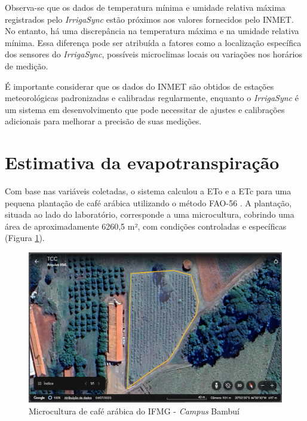 Observa-se que os dados de temperatura mínima e umidade relativa máxima registrados pelo \textit{IrrigaSync} estão próximos aos valores fornecidos pelo INMET. No entanto, há uma discrepância na temperatura máxima e na umidade relativa mínima. Essa diferença pode ser atribuída a fatores como a localização específica dos sensores do \textit{IrrigaSync}, possíveis microclimas locais ou variações nos horários de medição.

É importante considerar que os dados do INMET são obtidos de estações meteorológicas padronizadas e calibradas regularmente, enquanto o \textit{IrrigaSync} é um sistema em desenvolvimento que pode necessitar de ajustes e calibrações adicionais para melhorar a precisão de suas medições.

\section{Estimativa da evapotranspiração}

Com base nas variáveis coletadas, o sistema calculou a ETo e a ETc para uma pequena plantação de café arábica utilizando o método FAO-56 \parencite{Allen_evapotranspiration1998}. A plantação, situada ao lado do laboratório, corresponde a uma microcultura, cobrindo uma área de aproximadamente 6260,5 m², com condições controladas e específicas (Figura \ref{fig:plantacao-cafe}).

\begin{figure}[!htb] \centering
  \caption{Microcultura de café arábica do IFMG - \textit{Campus} Bambuí} \label{fig:plantacao-cafe}
  \begin{varwidth}{\linewidth}
    \includegraphics[width=16cm]{figuras/plantacao-cafe.png}
  \end{varwidth}
\end{figure}


